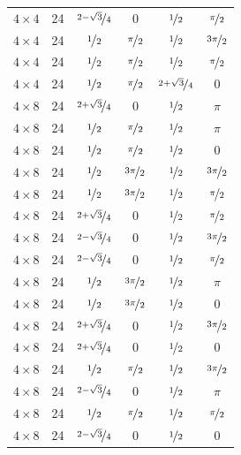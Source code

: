 \documentclass{article}
\begin{document}
\begin{longtable}{cccccc}
$4 \times 4$ & 24 & $\nicefrac{2-\sqrt{3}}{4}$ & 0 & $\nicefrac{1}{2}$ & $\nicefrac{\pi}{2}$ \\
$4 \times 4$ & 24 & $\nicefrac{1}{2}$ & $\nicefrac{\pi}{2}$ & $\nicefrac{1}{2}$ & $\nicefrac{3\pi}{2}$ \\
$4 \times 4$ & 24 & $\nicefrac{1}{2}$ & $\nicefrac{\pi}{2}$ & $\nicefrac{1}{2}$ & $\nicefrac{\pi}{2}$ \\
$4 \times 4$ & 24 & $\nicefrac{1}{2}$ & $\nicefrac{\pi}{2}$ & $\nicefrac{2+\sqrt{3}}{4}$ & 0 \\
$4 \times 8$ & 24 & $\nicefrac{2+\sqrt{3}}{4}$ & 0 & $\nicefrac{1}{2}$ & $\pi$ \\
$4 \times 8$ & 24 & $\nicefrac{1}{2}$ & $\nicefrac{\pi}{2}$ & $\nicefrac{1}{2}$ & $\pi$ \\
$4 \times 8$ & 24 & $\nicefrac{1}{2}$ & $\nicefrac{\pi}{2}$ & $\nicefrac{1}{2}$ & 0 \\
$4 \times 8$ & 24 & $\nicefrac{1}{2}$ & $\nicefrac{3\pi}{2}$ & $\nicefrac{1}{2}$ & $\nicefrac{3\pi}{2}$ \\
$4 \times 8$ & 24 & $\nicefrac{1}{2}$ & $\nicefrac{3\pi}{2}$ & $\nicefrac{1}{2}$ & $\nicefrac{\pi}{2}$ \\
$4 \times 8$ & 24 & $\nicefrac{2+\sqrt{3}}{4}$ & 0 & $\nicefrac{1}{2}$ & $\nicefrac{\pi}{2}$ \\
$4 \times 8$ & 24 & $\nicefrac{2-\sqrt{3}}{4}$ & 0 & $\nicefrac{1}{2}$ & $\nicefrac{3\pi}{2}$ \\
$4 \times 8$ & 24 & $\nicefrac{2-\sqrt{3}}{4}$ & 0 & $\nicefrac{1}{2}$ & $\nicefrac{\pi}{2}$ \\
$4 \times 8$ & 24 & $\nicefrac{1}{2}$ & $\nicefrac{3\pi}{2}$ & $\nicefrac{1}{2}$ & $\pi$ \\
$4 \times 8$ & 24 & $\nicefrac{1}{2}$ & $\nicefrac{3\pi}{2}$ & $\nicefrac{1}{2}$ & 0 \\
$4 \times 8$ & 24 & $\nicefrac{2+\sqrt{3}}{4}$ & 0 & $\nicefrac{1}{2}$ & $\nicefrac{3\pi}{2}$ \\
$4 \times 8$ & 24 & $\nicefrac{2+\sqrt{3}}{4}$ & 0 & $\nicefrac{1}{2}$ & 0 \\
$4 \times 8$ & 24 & $\nicefrac{1}{2}$ & $\nicefrac{\pi}{2}$ & $\nicefrac{1}{2}$ & $\nicefrac{3\pi}{2}$ \\
$4 \times 8$ & 24 & $\nicefrac{2-\sqrt{3}}{4}$ & 0 & $\nicefrac{1}{2}$ & $\pi$ \\
$4 \times 8$ & 24 & $\nicefrac{1}{2}$ & $\nicefrac{\pi}{2}$ & $\nicefrac{1}{2}$ & $\nicefrac{\pi}{2}$ \\
$4 \times 8$ & 24 & $\nicefrac{2-\sqrt{3}}{4}$ & 0 & $\nicefrac{1}{2}$ & 0 \\

\end{longtable}
\end{document}
